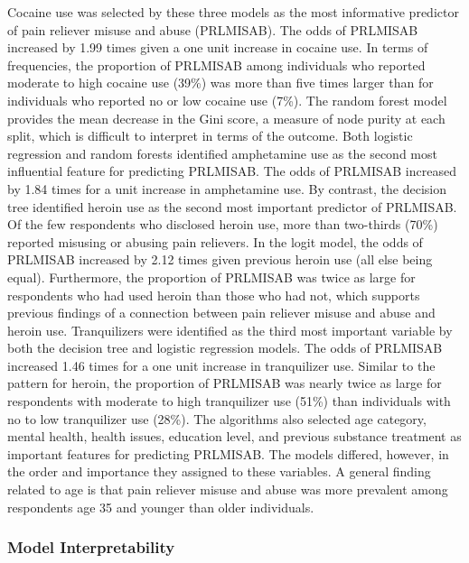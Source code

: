 \documentclass[sigconf]{acmart}
\begin{document}
Cocaine use was selected by these three models as the most informative 
predictor of pain reliever misuse and abuse (PRLMISAB). The odds of PRLMISAB
increased by 1.99 times given a one unit increase in cocaine use. In terms of
frequencies, the proportion of PRLMISAB among individuals who reported moderate 
to high cocaine use (39\%) was more than five times larger than for individuals 
who reported no or low cocaine use (7\%). The random forest model provides the 
mean decrease in the Gini score, a measure of node purity at each split, which 
is difficult to interpret in terms of the outcome. Both logistic regression and 
random forests identified amphetamine use as the second most influential 
feature for predicting PRLMISAB. The odds of PRLMISAB increased by 1.84 times 
for a unit increase in amphetamine use. By contrast, the decision tree 
identified heroin use as the second most important predictor of PRLMISAB.
Of the few respondents who disclosed heroin use, more than two-thirds (70\%) 
reported misusing or abusing pain relievers. In the logit model, the odds of 
PRLMISAB increased by 2.12 times given previous heroin use (all else being 
equal). Furthermore, the proportion of PRLMISAB was twice as large for 
respondents who had used heroin than those who had not, which supports
previous findings of a connection between pain reliever misuse and abuse and 
heroin use. Tranquilizers were identified as the third most important variable 
by both the decision tree and logistic regression models. The odds of PRLMISAB
increased 1.46 times for a one unit increase in tranquilizer use. Similar to 
the pattern for heroin, the proportion of PRLMISAB was nearly twice as large 
for respondents with moderate to high tranquilizer use (51\%) than individuals
with no to low tranquilizer use (28\%). The algorithms also selected age 
category, mental health, health issues, education level, and previous substance 
treatment as important features for predicting PRLMISAB. The models differed, 
however, in the order and importance they assigned to these variables. A 
general finding related to age is that pain reliever misuse and abuse was more 
prevalent among respondents age 35 and younger than older individuals. 


\subsubsection{Model Interpretability}
\end{document}
